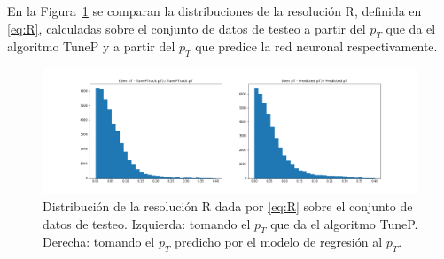 En la Figura~\ref{fig:R_predicted} se comparan la distribuciones de la resoluci\'on R, definida en \eqref{eq:R}, calculadas sobre el conjunto de datos de testeo a partir del $p_{T}$ que da el algoritmo TuneP y a partir del $p_{T}$ que predice la red neuronal respectivamente.

\begin{figure}[h]
\centering
\includegraphics[width=1.0\textwidth]{figures/R_predicted.png}
\caption{Distribuci\'on de la resoluci\'on R dada por \eqref{eq:R} sobre el conjunto de datos de testeo. Izquierda: tomando el $p_{T}$ que da el algoritmo TuneP. Derecha: tomando el $p_{T}$ predicho por el modelo de regresi\'on al $p_{T}$.}
\label{fig:R_predicted}        
\end{figure}

